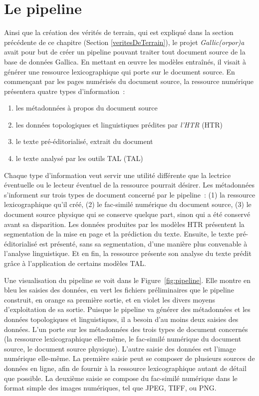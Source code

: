 \documentclass[class=article, crop=false]{standalone}
\begin{document}
\section{Le pipeline}
Ainsi que la création des vérités de terrain, qui est expliqué dans la section précédente de ce chapitre (Section \ref{veritesDeTerrain}), le projet \textit{Gallic(orpor)a} avait pour but de créer un pipeline pouvant traiter tout document source de la base de données Gallica. En mettant en œuvre les modèles entraînés, il visait à générer une ressource lexicographique qui porte sur le document source. En commençant par les pages numérisés du document source, la ressource numérique présentera quatre types d'information~:
\begin{enumerate}
\item les métadonnées à propos du document source
\item les données topologiques et linguistiques prédites par \textit{l'\acrlong{HTR}} (\acrshort{HTR})
\item le texte pré-éditorialisé, extrait du document
\item le texte analysé par les outils \acrlong{TAL} (\acrshort{TAL})
\end{enumerate}


Chaque type d'information veut servir une utilité différente que la lectrice éventuelle ou le lecteur éventuel de la ressource pourrait désirer. Les métadonnées s'informent sur trois types de document concerné par le pipeline~: (1) la ressource lexicographique qu'il créé, (2) le fac-similé numérique du document source, (3) le document source physique qui se conserve quelque part, sinon qui a été conservé avant sa disparition. Les données produites par les modèles \acrshort{HTR} présentent la segmentation de la mise en page et la prédiction du texte. Ensuite, le texte pré-éditorialisé est présenté, sans sa segmentation, d'une manière plus convenable à l'analyse linguistique. Et en fin, la ressource présente son analyse du texte prédit grâce à l'application de certains modèles \acrshort{TAL}.

Une visualisation du pipeline se voit dans le Figure~\ref{fig:pipeline}. Elle montre en bleu les saisies des données, en vert les fichiers préliminaires que le pipeline construit, en orange sa première sortie, et en violet les divers moyens d'exploitation de sa sortie. Puisque le pipeline va générer des métadonnées et les données topologiques et linguistiques, il a besoin d'au moins deux saisies des données. L'un porte sur les métadonnées des trois types de document concernés (la ressource lexicographique elle-même, le fac-similé numérique du document source, le document source physique). L'autre saisie des données est l'image numérique elle-même. La première saisie peut se composer de plusieurs sources de données en ligne, afin de fournir à la ressource lexicographique autant de détail que possible. La deuxième saisie se compose du fac-similé numérique dans le format simple des images numériques, tel que JPEG, TIFF, ou PNG.
\end{document}
